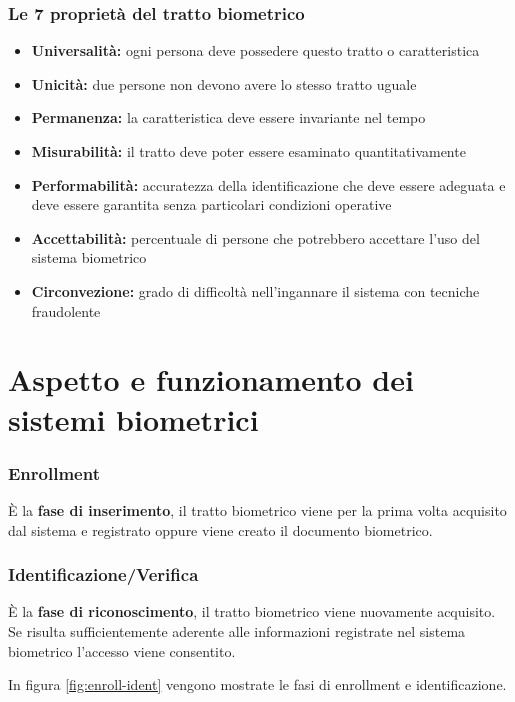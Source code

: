 \subsubsection{Le 7 proprietà del tratto biometrico}

\begin{itemize}
    \item \textbf{Universalità:} ogni persona deve possedere questo tratto o caratteristica
    \item \textbf{Unicità:} due persone non devono avere lo stesso tratto uguale
    \item \textbf{Permanenza:} la caratteristica deve essere invariante nel tempo
    \item \textbf{Misurabilità:} il tratto deve poter essere esaminato quantitativamente
    \item \textbf{Performabilità:} accuratezza della identificazione che deve essere adeguata e deve essere garantita senza particolari condizioni operative
    \item \textbf{Accettabilità:} percentuale di persone che potrebbero accettare l'uso del sistema biometrico
    \item \textbf{Circonvezione:} grado di difficoltà nell'ingannare il sistema con tecniche fraudolente
\end{itemize}

\section{Aspetto e funzionamento dei sistemi biometrici}

\subsubsection{Enrollment}

È la \textbf{fase di inserimento}, il tratto biometrico viene per la prima volta acquisito dal sistema e registrato oppure viene creato il documento biometrico.

\subsubsection{Identificazione/Verifica}

È la \textbf{fase di riconoscimento}, il tratto biometrico viene nuovamente acquisito. Se risulta sufficientemente aderente alle informazioni registrate nel sistema biometrico l'accesso viene consentito.

In figura \ref{fig:enroll-ident} vengono mostrate le fasi di enrollment e identificazione.

